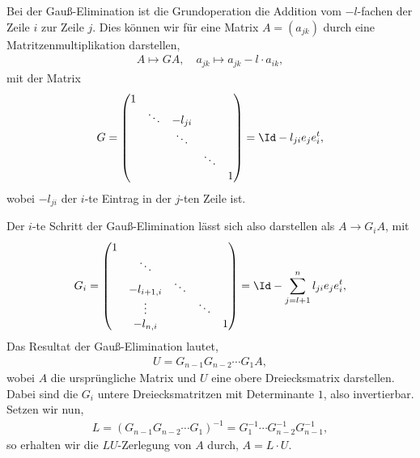 Bei der Gauß-Elimination ist die Grundoperation die Addition vom $-l$-fachen
der Zeile $i$ zur Zeile $j$. Dies können wir für eine Matrix $A=(a_{jk})$ durch
eine Matritzenmultiplikation darstellen,
\begin{align*}
A\mapsto GA,\quad a_{jk} \mapsto a_{jk}- l\cdot a_{ik},
\end{align*}
mit der Matrix
\begin{align*}
G = \begin{pmatrix}
1 & & & &  \\
 & \ddots & -l_{ji} & &  \\
 & & \ddots & &  \\
 & & & \ddots &  \\
 & & & &  1\\
\end{pmatrix} = \Id - l_{ji}e_je_i^t,
\end{align*}
wobei $-l_{ji}$ der $i$-te Eintrag in der $j$-ten Zeile ist.

Der $i$-te Schritt der Gauß-Elimination lässt sich also darstellen als $A\to
G_i A$, mit
\begin{align*}
G_i = \begin{pmatrix}
1 & & & &  \\
 & \ddots &  & &  \\
 & -l_{i+1,i}& \ddots & &  \\
 & \vdots& & \ddots &  \\
 & -l_{n,i}& & &  1\\
\end{pmatrix} = \Id - \sum\limits_{j=l+1}^n l_{ji}e_je_i^t,
\end{align*}
Das Resultat der Gauß-Elimination lautet,
\begin{align*}
U = G_{n-1}G_{n-2}\cdots G_1 A,
\end{align*}
wobei $A$ die ursprüngliche Matrix und $U$ eine obere Dreiecksmatrix
darstellen. Dabei sind die $G_i$ untere Dreiecksmatritzen mit
Determinante $1$, also invertierbar. Setzen wir nun,
\begin{align*}
L = (G_{n-1}G_{n-2}\cdots G_1)^{-1} = G_{1}^{-1}\cdots G_{n-2}^{-1}
G_{n-1}^{-1},
\end{align*}
so erhalten wir die $LU$-Zerlegung von $A$ durch, $A = L\cdot U$.

